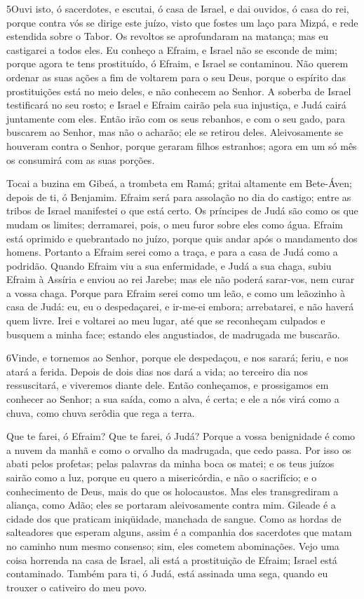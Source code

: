 \medskip

\lettrine{5} Ouvi isto, ó sacerdotes, e escutai, ó casa de
Israel, e dai ouvidos, ó casa do rei, porque contra vós se dirige
este juízo, visto que fostes um laço para Mizpá, e rede estendida
sobre o Tabor. Os revoltos se aprofundaram na matança; mas eu
castigarei a todos eles. Eu conheço a Efraim, e Israel não se
esconde de mim; porque agora te tens prostituído, ó Efraim, e Israel
se contaminou. Não querem ordenar as suas ações a fim de
voltarem para o seu Deus, porque o espírito das prostituições está
no meio deles, e não conhecem ao Senhor. A soberba de Israel
testificará no seu rosto; e Israel e Efraim cairão pela sua
injustiça, e Judá cairá juntamente com eles. Então irão com os
seus rebanhos, e com o seu gado, para buscarem ao Senhor, mas não o
acharão; ele se retirou deles. Aleivosamente se houveram contra
o Senhor, porque geraram filhos estranhos; agora em um só mês os
consumirá com as suas porções.

Tocai a buzina em Gibeá, a trombeta em Ramá; gritai altamente em
Bete-Áven; depois de ti, ó Benjamim. Efraim será para assolação
no dia do castigo; entre as tribos de Israel manifestei o que está
certo. Os príncipes de Judá são como os que mudam os limites;
derramarei, pois, o meu furor sobre eles como água. Efraim
está oprimido e quebrantado no juízo, porque quis andar após o
mandamento dos homens. Portanto a Efraim serei como a traça,
e para a casa de Judá como a podridão. Quando Efraim viu a
sua enfermidade, e Judá a sua chaga, subiu Efraim à Assíria e enviou
ao rei Jarebe; mas ele não poderá sarar-vos, nem curar a vossa
chaga. Porque para Efraim serei como um leão, e como um
leãozinho à casa de Judá: eu, eu o despedaçarei, e ir-me-ei embora;
arrebatarei, e não haverá quem livre. Irei e voltarei ao meu
lugar, até que se reconheçam culpados e busquem a minha face;
estando eles angustiados, de madrugada me buscarão.

\medskip

\lettrine{6} Vinde, e tornemos ao Senhor, porque ele
despedaçou, e nos sarará; feriu, e nos atará a ferida. Depois de
dois dias nos dará a vida; ao terceiro dia nos ressuscitará, e
viveremos diante dele. Então conheçamos, e prossigamos em
conhecer ao Senhor; a sua saída, como a alva, é certa; e ele a nós
virá como a chuva, como chuva serôdia que rega a terra.

Que te farei, ó Efraim? Que te farei, ó Judá? Porque a vossa
benignidade é como a nuvem da manhã e como o orvalho da madrugada,
que cedo passa. Por isso os abati pelos profetas; pelas palavras
da minha boca os matei; e os teus juízos sairão como a luz,
porque eu quero a misericórdia, e não o sacrifício; e o
conhecimento de Deus, mais do que os holocaustos. Mas eles
transgrediram a aliança, como Adão; eles se portaram aleivosamente
contra mim. Gileade é a cidade dos que praticam iniqüidade,
manchada de sangue. Como as hordas de salteadores que esperam
alguns, assim é a companhia dos sacerdotes que matam no caminho num
mesmo consenso; sim, eles cometem abominações. Vejo uma coisa
horrenda na casa de Israel, ali está a prostituição de Efraim;
Israel está contaminado. Também para ti, ó Judá, está
assinada uma sega, quando eu trouxer o cativeiro do meu povo.

